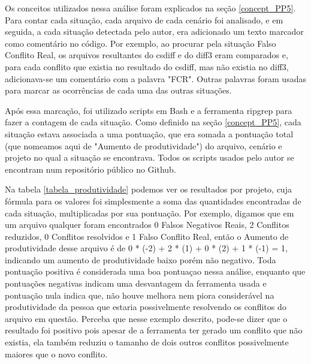 Os conceitos utilizados nessa análise foram explicados na seção \ref{concept_PP5}. Para contar cada situação, cada arquivo de cada
cenário foi analisado, e em seguida, a cada situação detectada pelo autor, era adicionado um texto marcador como comentário
no código. Por exemplo, ao procurar pela situação Falso Conflito Real, os arquivos resultantes do csdiff e do diff3 eram comparados
e, para cada conflito que existia no resultado do csdiff, mas não existia no diff3, adicionava-se um comentário com a palavra "FCR".
Outras palavras foram usadas para marcar as ocorrências de cada uma das outras situações.

Após essa marcação, foi utilizado scripts em Bash e a ferramenta ripgrep %
para fazer a contagem de cada situação. Como definido
na seção \ref{concept_PP5}, cada situação estava associada a uma pontuação, que era somada
a pontuação total (que nomeamos aqui de "Aumento de produtividade") do arquivo, cenário e projeto no qual a situação
se encontrava. Todos os scripts usados pelo autor se encontram num repositório público no Github. %

Na tabela \ref{tabela_produtividade} podemos ver os resultados por projeto, cuja fórmula para os valores foi simplesmente a soma
das quantidades encontradas de cada situação, multiplicadas por sua pontuação. Por exemplo, digamos que em um arquivo qualquer
foram encontrados 0 Falsos Negativos Reais, 2 Conflitos reduzidos, 0 Conflitos resolvidos e 1 Falso Conflito Real, então o
Aumento de produtividade desse arquivo é de 0 * (-2) + 2 * (1) + 0 * (2) + 1 * (-1) = 1, indicando um aumento de
produtividade baixo porém não negativo. Toda pontuação positiva é considerada uma boa pontuaçao nessa análise, enquanto que
pontuações negativas indicam uma desvantagem da ferramenta usada e pontuação nula indica que, não houve melhora nem piora
considerável na produtividade da pessoa que estaria possivelmente resolvendo os conflitos do arquivo em questão.
Perceba que nesse exemplo descrito, pode-se dizer que o resultado foi positivo pois apesar de a ferramenta ter gerado um
conflito que não existia, ela também reduziu o tamanho de dois outros conflitos possivelmente maiores que o novo conflito.


